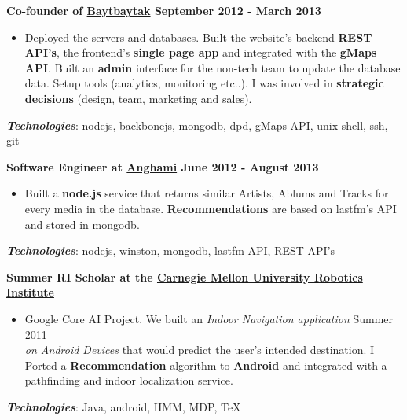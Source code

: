 \documentclass[10pt]{article}
\newenvironment{outerlist}[1][\enskip\textbullet]%
        {\begin{itemize}[#1]}{\end{itemize}%
         \vspace{-.6\baselineskip}}
\begin{document}
\textbf{Co-founder of \href{http://baytbaytak.com}{Baytbaytak} \hfill \small September 2012 - March 2013} 
\begin{outerlist}
\item[] Deployed the servers and databases.
Built the website's backend \textbf{REST API's}, the frontend's \textbf{single page app} and integrated with the \textbf{gMaps API}. 
Built an \textbf{admin} interface for the non-tech team to update the database data. Setup tools (analytics, monitoring etc..).
I was involved in \textbf{strategic decisions} (design, team, marketing and sales).
\end{outerlist}

\vspace{0.2cm}
\hspace{0.25cm}\textbf{\textit{Technologies}}: 
nodejs, backbonejs, mongodb, dpd, gMaps API, unix shell, ssh, git

\vspace{0.4cm}

\textbf{
  Software Engineer at \href{http://anghami.com/}{Anghami} 
  \hfill \small June 2012 - August 2013
}
\begin{outerlist}
\item[] Built a \textbf{node.js} service that returns similar Artists, 
Ablums and Tracks for every media in the database.
\textbf{Recommendations} are based on lastfm's API and stored in mongodb.
\end{outerlist}

\vspace{0.2cm}
\hspace{0.25cm}\textbf{\textit{Technologies}}: 
nodejs, winston, mongodb, lastfm API, REST API's

\vspace{0.4cm}

\textbf{Summer RI Scholar at the \href{http://www.ri.cmu.edu/}{Carnegie Mellon University Robotics Institute}}
\begin{outerlist}
\item[] Google Core AI Project. We built an \textit{Indoor Navigation application}
\hfill \small Summer 2011 \\
\textit{on Android Devices} that would predict the user's intended destination.
I Ported a \textbf{Recommendation}
algorithm to \textbf{Android} and integrated with a pathfinding and indoor localization service.
\end{outerlist}

\vspace{0.2cm}
\hspace{0.25cm}\textbf{\textit{Technologies}}: 
Java, android, HMM, MDP, \TeX{}
\end{document}
